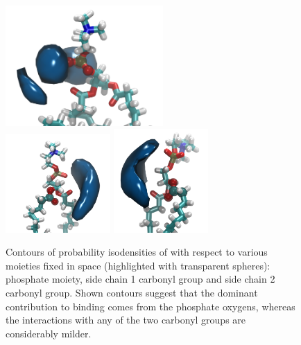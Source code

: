 \documentclass[aip,jcp,twocolumn]{revtex4}
\begin{document}
\begin{figure}[tbp]
  \centering
  \includegraphics[width=6.0cm]{../Fig/volmap_resid10_Ca_Cl_PO4Cent.png} \\
  \includegraphics[width=4.0cm]{../Fig/volmap_resid10_Ca_Cl_sn1Cent.png}
  \includegraphics[width=3.6cm]{../Fig/volmap_resid10_Ca_Cl_sn2Cent.png}
  \caption{\label{fig:volmaps}
      Contours of probability isodensities of  with respect to 
      various moieties fixed in space (highlighted with transparent spheres): 
      phosphate moiety, side chain 1 carbonyl group and side chain 2 carbonyl group.
      Shown contours suggest that the dominant contribution 
      to  binding comes from the phosphate oxygens,
      whereas the interactions with any of the two carbonyl groups are considerably milder.
  }
\end{figure}


\end{document}
